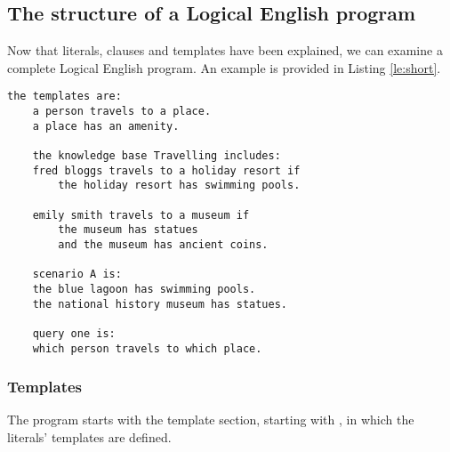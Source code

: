 \documentclass[../main.tex]{subfiles}
\begin{document}
\subsection{The structure of a Logical English program}
Now that literals, clauses and templates have been explained, we can examine a complete Logical English program. An example is provided in Listing \ref{le:short}.
\begin{lstlisting}[caption={A short Logical English program.},label={le:short}]
    the templates are:
    a person travels to a place.
    a place has an amenity.
    
    the knowledge base Travelling includes:
    fred bloggs travels to a holiday resort if 
        the holiday resort has swimming pools.
    
    emily smith travels to a museum if
        the museum has statues 
        and the museum has ancient coins.
    
    scenario A is:
    the blue lagoon has swimming pools.
    the national history museum has statues.
    
    query one is:
    which person travels to which place.
\end{lstlisting}

\subsubsection{Templates}
The program starts with the template section, starting with , in which the literals' templates are defined. 
\end{document}
